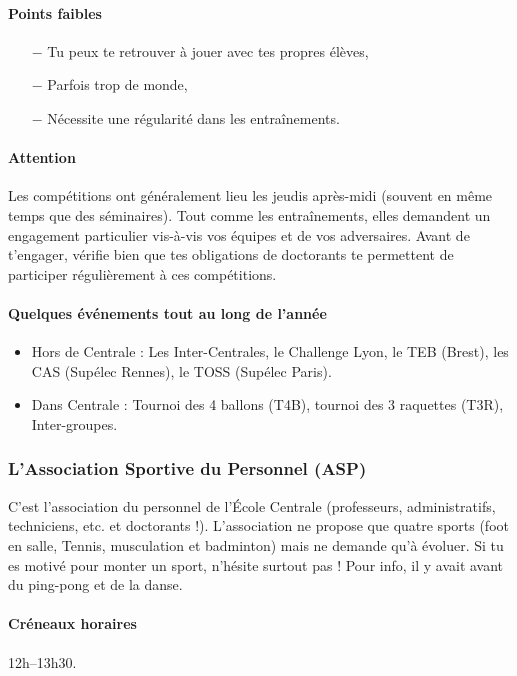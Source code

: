 \paragraph{Points faibles}
\begin{itemize}
  \item[$-$] Tu peux te retrouver à jouer avec tes propres élèves,
  \item[$-$] Parfois trop de monde,
  \item[$-$] Nécessite une régularité dans les entraînements.
\end{itemize}

\paragraph{Attention} Les compétitions ont généralement lieu les jeudis après-midi (souvent en même temps que des séminaires).
Tout comme les entraînements, elles demandent un engagement particulier vis-à-vis vos équipes et de vos adversaires.
Avant de t'engager, vérifie bien que tes obligations de doctorants te permettent de participer régulièrement à ces compétitions.

\paragraph{Quelques événements tout au long de l'année}
\begin{itemize}
  \item Hors de Centrale : Les Inter-Centrales, le Challenge Lyon, le TEB (Brest), les CAS (Supélec Rennes), le TOSS (Supélec Paris).
  \item Dans Centrale : Tournoi des 4 ballons (T4B), tournoi des 3 raquettes (T3R), Inter-groupes.
\end{itemize}

\subsubsection{L'Association Sportive du Personnel (ASP)}
C'est l'association du personnel de l'École Centrale (professeurs, administratifs, techniciens, etc. et doctorants !). L'association ne propose que quatre sports (foot en salle, Tennis, musculation et badminton) mais ne demande qu'à évoluer. Si tu es motivé pour monter un sport, n'hésite surtout pas ! Pour info, il y avait avant du ping-pong et de la danse.

\paragraph{Créneaux horaires} 12h--13h30.
